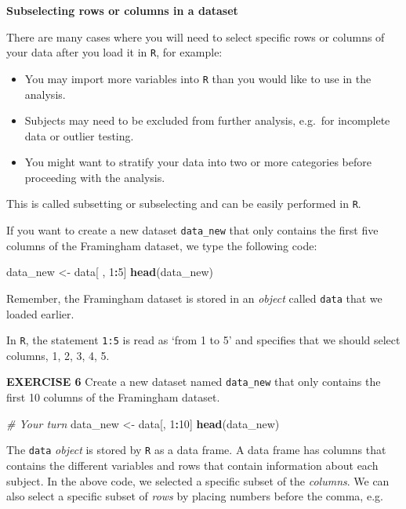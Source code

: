 \documentclass[
]{article}
\newenvironment{Shaded}{\begin{snugshade}}{\end{snugshade}}
\newcommand{\CommentTok}[1]{\textcolor[rgb]{0.56,0.35,0.01}{\textit{#1}}}
\newcommand{\DecValTok}[1]{\textcolor[rgb]{0.00,0.00,0.81}{#1}}
\newcommand{\KeywordTok}[1]{\textcolor[rgb]{0.13,0.29,0.53}{\textbf{#1}}}
\newcommand{\NormalTok}[1]{#1}
\newcommand{\OperatorTok}[1]{\textcolor[rgb]{0.81,0.36,0.00}{\textbf{#1}}}
\newcommand{\StringTok}[1]{\textcolor[rgb]{0.31,0.60,0.02}{#1}}
\begin{document}
\textbf{Subselecting rows or columns in a dataset}

There are many cases where you will need to select specific rows or
columns of your data after you load it in \texttt{R}, for example:

\begin{itemize}
\item
  You may import more variables into \texttt{R} than you would like to
  use in the analysis.
\item
  Subjects may need to be excluded from further analysis, e.g.~for
  incomplete data or outlier testing.
\item
  You might want to stratify your data into two or more categories
  before proceeding with the analysis.
\end{itemize}

This is called subsetting or subselecting and can be easily performed in
\texttt{R}.

If you want to create a new dataset \texttt{data\_new} that only
contains the first five columns of the Framingham dataset, we type the
following code:

\begin{Shaded}
\begin{Highlighting}[]
\NormalTok{data_new <-}\StringTok{ }\NormalTok{data[ , }\DecValTok{1}\OperatorTok{:}\DecValTok{5}\NormalTok{]}
\KeywordTok{head}\NormalTok{(data_new)}
\end{Highlighting}
\end{Shaded}

Remember, the Framingham dataset is stored in an \emph{object} called
\texttt{data} that we loaded earlier.

In \texttt{R}, the statement \texttt{1:5} is read as `from 1 to 5' and
specifies that we should select columns, 1, 2, 3, 4, 5.

\textbf{EXERCISE 6} Create a new dataset named \texttt{data\_new} that
only contains the first 10 columns of the Framingham dataset.

\begin{Shaded}
\begin{Highlighting}[]
\CommentTok{# Your turn}
\NormalTok{data_new <-}\StringTok{ }\NormalTok{data[, }\DecValTok{1}\OperatorTok{:}\DecValTok{10}\NormalTok{]}
\KeywordTok{head}\NormalTok{(data_new)}
\end{Highlighting}
\end{Shaded}

The \texttt{data} \emph{object} is stored by \texttt{R} as a data frame.
A data frame has columns that contains the different variables and rows
that contain information about each subject. In the above code, we
selected a specific subset of the \emph{columns}. We can also select a
specific subset of \emph{rows} by placing numbers before the comma,
e.g.~
\end{document}
